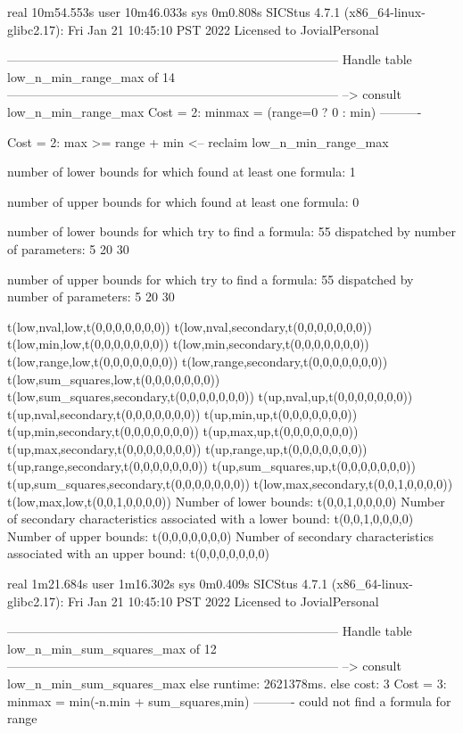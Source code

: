 real	10m54.553s
user	10m46.033s
sys	0m0.808s
SICStus 4.7.1 (x86_64-linux-glibc2.17): Fri Jan 21 10:45:10 PST 2022
Licensed to JovialPersonal


--------------------------------------------------------------------------------
Handle table low_n_min_range_max of 14
--------------------------------------------------------------------------------
--> consult low_n_min_range_max
Cost =  2:  minmax = (range=0 ? 0 : min)
----------

Cost =  2:  max >= range + min
<-- reclaim low_n_min_range_max

number of lower bounds for which found at least one formula: 1

number of upper bounds for which found at least one formula: 0

number of lower bounds for which try to find a formula: 55
dispatched by number of parameters: 5  20  30

number of upper bounds for which try to find a formula: 55
dispatched by number of parameters: 5  20  30

t(low,nval,low,t(0,0,0,0,0,0,0))
t(low,nval,secondary,t(0,0,0,0,0,0,0))
t(low,min,low,t(0,0,0,0,0,0,0))
t(low,min,secondary,t(0,0,0,0,0,0,0))
t(low,range,low,t(0,0,0,0,0,0,0))
t(low,range,secondary,t(0,0,0,0,0,0,0))
t(low,sum_squares,low,t(0,0,0,0,0,0,0))
t(low,sum_squares,secondary,t(0,0,0,0,0,0,0))
t(up,nval,up,t(0,0,0,0,0,0,0))
t(up,nval,secondary,t(0,0,0,0,0,0,0))
t(up,min,up,t(0,0,0,0,0,0,0))
t(up,min,secondary,t(0,0,0,0,0,0,0))
t(up,max,up,t(0,0,0,0,0,0,0))
t(up,max,secondary,t(0,0,0,0,0,0,0))
t(up,range,up,t(0,0,0,0,0,0,0))
t(up,range,secondary,t(0,0,0,0,0,0,0))
t(up,sum_squares,up,t(0,0,0,0,0,0,0))
t(up,sum_squares,secondary,t(0,0,0,0,0,0,0))
t(low,max,secondary,t(0,0,1,0,0,0,0))
t(low,max,low,t(0,0,1,0,0,0,0))
Number of lower bounds:                                             t(0,0,1,0,0,0,0)
Number of secondary characteristics associated with a lower bound:  t(0,0,1,0,0,0,0)
Number of upper bounds:                                             t(0,0,0,0,0,0,0)
Number of secondary characteristics associated with an upper bound: t(0,0,0,0,0,0,0)

real	1m21.684s
user	1m16.302s
sys	0m0.409s
SICStus 4.7.1 (x86_64-linux-glibc2.17): Fri Jan 21 10:45:10 PST 2022
Licensed to JovialPersonal


--------------------------------------------------------------------------------
Handle table low_n_min_sum_squares_max of 12
--------------------------------------------------------------------------------
--> consult low_n_min_sum_squares_max
else runtime: 2621378ms. else cost: 3
Cost =  3:  minmax = min(-n.min + sum_squares,min) %
----------
could not find a formula for range

